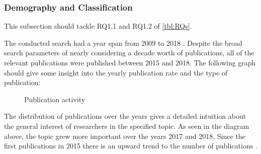 \subsubsection{Demography and Classification}

This subsection should tackle RQ1.1 and RQ1.2 of \autoref{tbl:RQs}.

The conducted search had a year span from 2009 to 2018 \cite{waseem:SMSMSADevOps}.
Despite the broad search parameters of nearly considering a decade worth
of publications, all of the relevant publications were published between
2015 and 2018. The following graph should give some insight into the yearly
publication rate and the type of publication:

\begin{figure}
    \caption{Publication activity}
\end{figure}

The distribution of publications over the years gives a detailed intuition
about the general interest of researchers in the specified topic. As seen
in the diagram above, the topic grew more important over the years 2017 and
2018. Since the first publications in 2015 there is an upward trend to
the number of publications \cite{waseem:SMSMSADevOps}.

